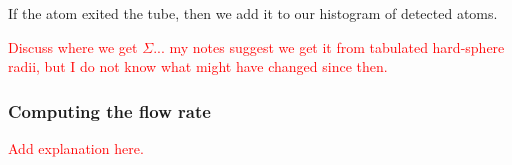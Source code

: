 \documentclass{article}
\newcommand\fixme[1]{\textcolor{red}{\sc #1}}
\begin{document}
If the atom exited the tube, then we add it to our histogram of detected
atoms.

\fixme{Discuss where we get $\Sigma$... my notes suggest we get it from tabulated hard-sphere radii, but I do not know what might have changed since then.}

\subsubsection{Computing the flow rate}
\fixme{Add explanation here.}
\end{document}
